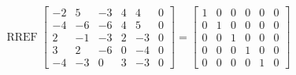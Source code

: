 \begin{exerciseAnswer} 


\[\operatorname{RREF} \left[\begin{array}{ccccc|c}
-2 & 5 & -3 & 4 & 4 & 0 \\
-4 & -6 & -6 & 4 & 5 & 0 \\
2 & -1 & -3 & 2 & -3 & 0 \\
3 & 2 & -6 & 0 & -4 & 0 \\
-4 & -3 & 0 & 3 & -3 & 0
\end{array}\right] = \left[\begin{array}{ccccc|c}
1 & 0 & 0 & 0 & 0 & 0 \\
0 & 1 & 0 & 0 & 0 & 0 \\
0 & 0 & 1 & 0 & 0 & 0 \\
0 & 0 & 0 & 1 & 0 & 0 \\
0 & 0 & 0 & 0 & 1 & 0
\end{array}\right] \]



\end{exerciseAnswer}

